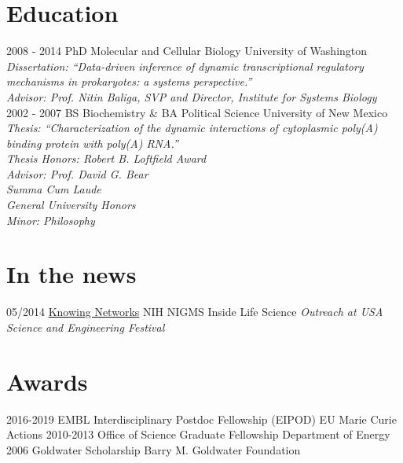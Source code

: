 \documentclass[]{friggeri-cv}
\begin{document}
\section{Education}
\begin{entrylist}
  \entry
    {2008 - 2014}
    {PhD Molecular and Cellular Biology}
    {University of Washington}
    {\emph{Dissertation: ``Data-driven inference of dynamic transcriptional regulatory mechanisms in prokaryotes: a systems perspective.''}\\
    \emph{Advisor: Prof. Nitin Baliga, SVP and Director, Institute for Systems Biology}\\}
  \entry
    {2002 - 2007}
    {BS Biochemistry \& BA Political Science}
    {University of New Mexico}
    {\emph{Thesis: ``Characterization of the dynamic interactions of cytoplasmic poly(A) binding protein with poly(A) RNA.''}\\
    \textit{Thesis Honors: Robert B. Loftfield Award}\\
    \emph{Advisor: Prof. David G. Bear}\\
    \textit{Summa Cum Laude}\\
    \textit{General University Honors}\\
    \textit{Minor: Philosophy}}
\end{entrylist}
\newpage
\section{In the news}
\begin{entrylist}
  \entry
    {05/2014}
    {\href{http://publications.nigms.nih.gov/insidelifescience/knowing-networks.html}{Knowing Networks}}
    {NIH NIGMS Inside Life Science}
    {\emph{Outreach at USA Science and Engineering Festival}}
\end{entrylist}

\section{Awards}
\begin{entrylist}
   \entry
    {2016-2019}
    {EMBL Interdisciplinary Postdoc Fellowship (EIPOD)}
    {EU Marie Curie Actions}
    {}
  \entry
    {2010-2013}
    {Office of Science Graduate Fellowship}
    {Department of Energy}
    {}
   \entry
    {2006}
    {Goldwater Scholarship}
    {Barry M. Goldwater Foundation}
    {}
\end{entrylist}
\end{document}
